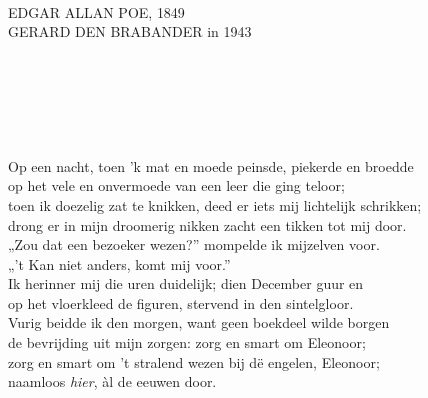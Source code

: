 \documentclass{memoir}
\begin{document}

\begin{multicols}{2}
\huge\noindent\strut\\\strut\\\strut\\\strut\\{\\
\strut\\
\\\strut\\
\hspace{-16mm}EDGAR ALLAN POE, {1849}\\
 GERARD DEN BRABANDER {in} {1943}\\}\strut\\\strut\\\strut\\\vspace{-2mm}

\noindent Op een nacht, toen 'k mat en moede peinsde, piekerde en broedde\\
op het vele en onvermoede van een leer die ging teloor;\\
toen ik doezelig zat te knikken, deed er iets mij lichtelijk schrikken;\\
drong er in mijn droomerig nikken zacht een tikken tot mij door.\\
„Zou dat een bezoeker wezen?” mompelde ik mijzelven voor.\\
\indent\indent „'t Kan niet anders, komt mij voor.”\\

\noindent Ik herinner mij die uren duidelijk; dien December guur en\\
op het vloerkleed de figuren, stervend in den sintelgloor.\\
Vurig beidde ik den morgen, want geen boekdeel wilde borgen\\
de bevrijding uit mijn zorgen: zorg en smart om Eleonoor;\\
zorg en smart om 't stralend wezen bij dë engelen, Eleonoor;\\
\indent\indent naamloos {\itshape hier}, àl de eeuwen door.\\


\end{multicols}
\end{document}
